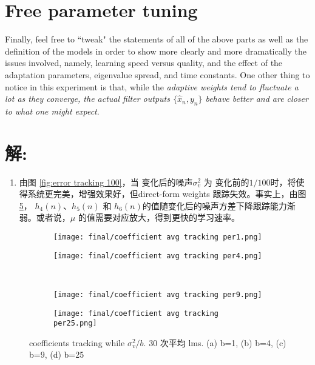 \documentclass[11pt]{article}
\begin{document}
\section{Free parameter tuning}
Finally, feel free to ``tweak" the statements of all of the above parts as well as the definition of the models in order to show more clearly and more dramatically the issues involved, namely, learning speed versus quality, and the effect of the adaptation parameters, eigenvalue spread, and time constants. One other thing to notice in this experiment is that, while the \emph{adaptive weights tend to fluctuate a lot as they converge, the actual filter outputs $\{\hat{x}_n, y_n\}$ behave better and are closer to what one might expect}.

\section*{解:}\label{solution: d}

\begin{enumerate}
    \item 由图 \ref{fig:error tracking 100}，当 变化后的噪声$\sigma_v^2$ 为 变化前的$1/100$时，将使得系统更完美，增强效果好，但direct-form weights 跟踪失效。事实上，由图 \ref{fig:coefficients tracking avg b-set}， $h_4(n)$、$h_5(n)$ 和 $h_6(n)$的值随变化后的噪声方差下降跟踪能力渐弱。或者说，$\mu$ 的值需要对应放大，得到更快的学习速率。
\end{enumerate}

\begin{figure}[!htbp]
    \centering
    \begin{subfigure}[b]{0.49\textwidth}
      \texttt{[image: final/coefficient avg tracking per1.png]}
      \caption{}
      \label{fig:coefficient tracking lms per1}
    \end{subfigure}%
    \hfill  %
    \begin{subfigure}[b]{0.49\textwidth}
      \texttt{[image: final/coefficient avg tracking per4.png]}
      \caption{}
      \label{fig:error tracking lms per4}
    \end{subfigure}\\
    \begin{subfigure}[b]{0.49\textwidth}
      \texttt{[image: final/coefficient avg tracking per9.png]}
      \caption{}
      \label{fig:error tracking lms per9}
    \end{subfigure}
    \hfill
    \begin{subfigure}[b]{0.49\textwidth}
      \texttt{[image: final/coefficient avg tracking per25.png]}
      \caption{}
      \label{fig:error tracking lms per25}
    \end{subfigure}
    \caption{coefficients tracking while $\sigma_v^2/b $. 30 次平均 lms. (a) b=1, (b) b=4, (c) b=9, (d) b=25}
    \label{fig:coefficients tracking avg b-set}
\end{figure}
\end{document}
